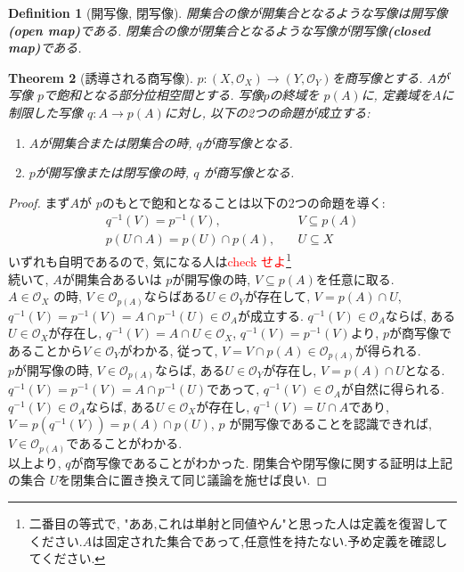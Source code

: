 \documentclass[lualatex]{ltjsbook}
\newtheorem{theorem}{Theorem}[section]
\newtheorem{definition}[theorem]{Definition}
\theoremstyle{remark}
\theoremstyle{plain}
\begin{document}
\begin{definition}[開写像, 閉写像]
開集合の像が開集合となるような写像は開写像\textbf{(open map)}である. 閉集合の像が閉集合となるような写像が閉写像\textbf{(closed map)}である.	
\end{definition}

\begin{theorem}[誘導される商写像]
	$p: (X,\mathcal{O}_X) \to \left( Y,\mathcal{O}_Y \right) $を商写像とする. $A$が写像 $p$で飽和となる部分位相空間とする.  写像$p$の終域を $p(A)$に, 定義域を$A$に制限した写像 $q: A \to p(A)$に対し, 以下の2つの命題が成立する:
	\begin{enumerate}
		\item $A$が開集合または閉集合の時,  $q$が商写像となる.
		\item  $p$が開写像または閉写像の時,  $q$ が商写像となる.
	\end{enumerate}
\end{theorem}

\begin{proof}%
	まず$A$が $p$のもとで飽和となることは以下の2つの命題を導く:
	 \[
	\begin{aligned}%
		q^{-1}(V) = p ^{-1}(V), \quad & V \subseteq p(A)\\
		p(U\cap A) = p(U) \cap p(A), \quad & U\subseteq X 
	\end{aligned}
	\]
	いずれも自明であるので, 気になる人は\textcolor{red}{check せよ}\footnote{二番目の等式で, "ああ,これは単射と同値やん"と思った人は定義を復習してください.$A$は固定された集合であって,任意性を持たない.予め定義を確認してください.}\\
	続いて, $A$が開集合あるいは $p$が開写像の時,  $V \subseteq p(A)$を任意に取る.\\
	$A \in \mathcal{O}_X$ の時, $V \in \mathcal{O}_{p(A)}$ならばある$U \in \mathcal{O}_Y $が存在して, 
	$V = p(A) \cap U$, $q^{-1}(V) = p ^{-1}(V) = A \cap p^{-1}(U) \in \mathcal{O}_A$が成立する. 
	$q^{-1}(V) \in \mathcal{O}_A$ならば, ある$U \in \mathcal{O}_X$が存在し, 
	$q^{-1}(V) = A \cap U \in \mathcal{O}_X$, $q^{-1}(V) = p ^{-1}(V)$より, 
	$p$が商写像であることから$V \in \mathcal{O}_Y$がわかる, 従って, $V =V \cap p(A)\in \mathcal{O}_{p(A)}$が得られる. \\
	$p$が開写像の時,  $V \in \mathcal{O}_{p(A)}$ならば, ある$U \in \mathcal{O}_Y$が存在し, 
	$V = p(A) \cap U$となる. 
	$q^{-1}(V) = p ^{-1}(V) = A \cap p ^{-1}(U)$であって, 
	$q^{-1}(V) \in \mathcal{O}_A$が自然に得られる. 
	$q^{-1}(V) \in \mathcal{O}_A$ならば, ある$U \in \mathcal{O}_X$が存在し,
	$q^{-1} (V) =U \cap A$であり, $V=p(q^{-1}(V)) = p(A) \cap p(U)$, 
	$p$ が開写像であることを認識できれば, $V \in \mathcal{O}_{p(A)}$であることがわかる.\\
	以上より, $q$が商写像であることがわかった. 閉集合や閉写像に関する証明は上記の集合 $U$を閉集合に置き換えて同じ議論を施せば良い.
\end{proof}
\end{document}
